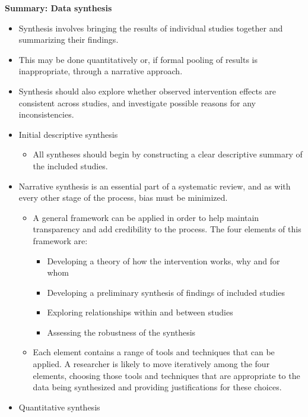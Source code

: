 \documentclass[
  11pt,
  a4paper,
  DIV=11,
  numbers=noendperiod]{scrreprt}
\providecommand{\tightlist}{%
  \setlength{\itemsep}{0pt}\setlength{\parskip}{0pt}}
\begin{document}
\textbf{Summary: Data synthesis}

\begin{itemize}
\item
  Synthesis involves bringing the results of individual studies together
  and summarizing their findings.
\item
  This may be done quantitatively or, if formal pooling of results is
  inappropriate, through a narrative approach.
\item
  Synthesis should also explore whether observed intervention effects
  are consistent across studies, and investigate possible reasons for
  any inconsistencies.
\item
  Initial descriptive synthesis

  \begin{itemize}
  \tightlist
  \item
    All syntheses should begin by constructing a clear descriptive
    summary of the included studies.
  \end{itemize}
\item
  Narrative synthesis is an essential part of a systematic review, and
  as with every other stage of the process, bias must be minimized.

  \begin{itemize}
  \item
    A general framework can be applied in order to help maintain
    transparency and add credibility to the process. The four elements
    of this framework are:

    \begin{itemize}
    \item
      Developing a theory of how the intervention works, why and for
      whom
    \item
      Developing a preliminary synthesis of findings of included studies
    \item
      Exploring relationships within and between studies
    \item
      Assessing the robustness of the synthesis
    \end{itemize}
  \item
    Each element contains a range of tools and techniques that can be
    applied. A researcher is likely to move iteratively among the four
    elements, choosing those tools and techniques that are appropriate
    to the data being synthesized and providing justifications for these
    choices.
  \end{itemize}
\item
  Quantitative synthesis


\end{itemize}
\end{document}
